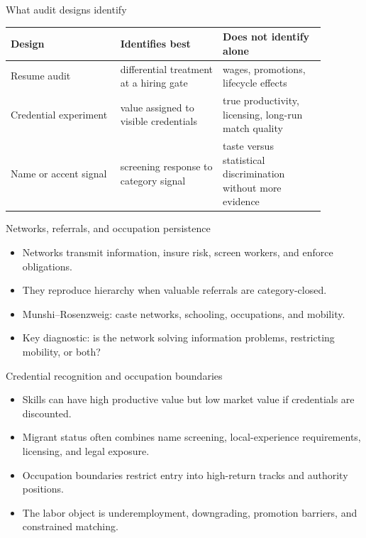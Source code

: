 \documentclass[aspectratio=169,11pt]{beamer}
\begin{document}
\begin{frame}{What audit designs identify}
\small
\begin{tabular}{p{0.30\linewidth} p{0.29\linewidth} p{0.29\linewidth}}
\toprule
Design & Identifies best & Does not identify alone \\
\midrule
Resume audit & differential treatment at a hiring gate & wages, promotions, lifecycle effects \\
Credential experiment & value assigned to visible credentials & true productivity, licensing, long-run match quality \\
Name or accent signal & screening response to category signal & taste versus statistical discrimination without more evidence \\
\bottomrule
\end{tabular}
\end{frame}

\begin{frame}{Networks, referrals, and occupation persistence}
\begin{itemize}
    \item Networks transmit information, insure risk, screen workers, and enforce obligations.
    \item They reproduce hierarchy when valuable referrals are category-closed.
    \item Munshi--Rosenzweig: caste networks, schooling, occupations, and mobility.
    \item Key diagnostic: is the network solving information problems, restricting mobility, or both?
\end{itemize}
\end{frame}

\begin{frame}{Credential recognition and occupation boundaries}
\begin{itemize}
    \item Skills can have high productive value but low market value if credentials are discounted.
    \item Migrant status often combines name screening, local-experience requirements, licensing, and legal exposure.
    \item Occupation boundaries restrict entry into high-return tracks and authority positions.
    \item The labor object is underemployment, downgrading, promotion barriers, and constrained matching.
\end{itemize}
\end{frame}
\end{document}
